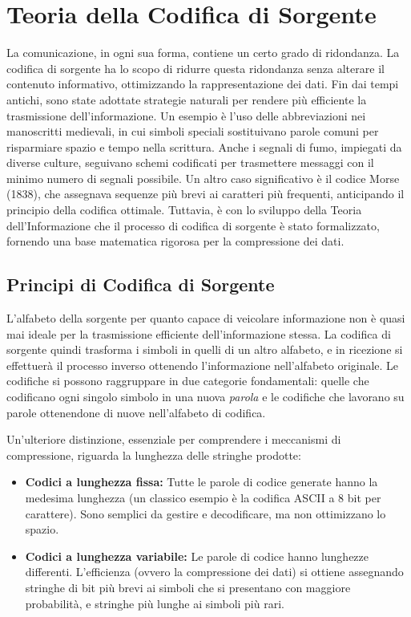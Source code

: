 \part{Teoria della Codifica di Sorgente}
La comunicazione, in ogni sua forma, contiene un certo grado di ridondanza. La codifica di sorgente ha lo scopo di ridurre questa ridondanza senza alterare il contenuto informativo, ottimizzando la rappresentazione dei dati. Fin dai tempi antichi, sono state adottate strategie naturali per rendere più efficiente la trasmissione dell'informazione. Un esempio è l'uso delle abbreviazioni nei manoscritti medievali, in cui simboli speciali sostituivano parole comuni per risparmiare spazio e tempo nella scrittura. Anche i segnali di fumo, impiegati da diverse culture, seguivano schemi codificati per trasmettere messaggi con il minimo numero di segnali possibile. Un altro caso significativo è il codice Morse (1838), che assegnava sequenze più brevi ai caratteri più frequenti, anticipando il principio della codifica ottimale. Tuttavia, è con lo sviluppo della Teoria dell'Informazione che il processo di codifica di sorgente è stato formalizzato, fornendo una base matematica rigorosa per la compressione dei dati.

\chapter{Principi di Codifica di Sorgente}

L'alfabeto della sorgente per quanto capace di veicolare informazione non è quasi mai ideale per la trasmissione efficiente dell'informazione stessa. La codifica di sorgente quindi trasforma i simboli in quelli di un altro alfabeto, e in ricezione si effettuerà il processo inverso ottenendo l'informazione nell'alfabeto originale. 
Le codifiche si possono raggruppare in due categorie fondamentali: quelle che codificano ogni singolo simbolo in una nuova \textit{parola} e le codifiche che lavorano su parole ottenendone di nuove nell'alfabeto di codifica.

Un'ulteriore distinzione, essenziale per comprendere i meccanismi di compressione, riguarda la lunghezza delle stringhe prodotte:
\begin{itemize}
    \item \textbf{Codici a lunghezza fissa:} Tutte le parole di codice generate hanno la medesima lunghezza (un classico esempio è la codifica ASCII a 8 bit per carattere). Sono semplici da gestire e decodificare, ma non ottimizzano lo spazio.
    \item \textbf{Codici a lunghezza variabile:} Le parole di codice hanno lunghezze differenti. L'efficienza (ovvero la compressione dei dati) si ottiene assegnando stringhe di bit più brevi ai simboli che si presentano con maggiore probabilità, e stringhe più lunghe ai simboli più rari.
\end{itemize}
